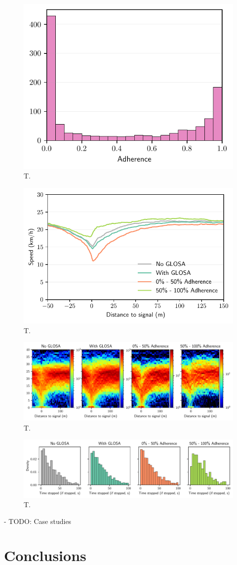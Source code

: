 \begin{figure}[t]
\caption{T.}\label{fig:}
\includegraphics[width=0.6\linewidth]{images/impacts-adherence.pdf}
\end{figure}

\begin{figure}[t]
\caption{T.}\label{fig:}
\includegraphics[width=0.6\linewidth]{images/impacts-approach-speed.pdf}
\end{figure}

\begin{figure}[t]
\caption{T.}\label{fig:}
\includegraphics[width=\linewidth]{images/impacts-approach-speed-heatmap.pdf}
\end{figure}

\begin{figure}[t]
\caption{T.}\label{fig:}
\includegraphics[width=\linewidth]{images/impacts-stop-time-adherence.pdf}
\end{figure}

- TODO: Case studies

\section{Conclusions}
